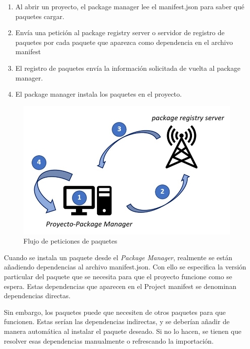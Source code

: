 \begin{enumerate}
    \item Al abrir un proyecto, el package manager lee el manifest.json para saber qué paquetes cargar.
    \item Envía una petición al package registry server o servidor de registro de paquetes por cada paquete que aparezca como dependencia en el archivo manifest
    \item El registro de paquetes envía la información solicitada de vuelta al package manager.
    \item El package manager instala los paquetes en el proyecto.
\end{enumerate}

\begin{figure}[h]
    \centering
    \includegraphics[scale=0.45]{img/PackageManagerFlowchart.jpg}
    \caption{Flujo de peticiones de paquetes}
    \label{fig:FlujoPaquetes}
    \end{figure}

Cuando se instala un paquete desde el \textit{Package Manager}, realmente se están añadiendo dependencias al archivo manifest.json. Con ello se especifica la versión particular del paquete que se necesita para que el proyecto funcione como se espera. Estas dependencias que aparecen en el Project manifest se denominan dependencias directas.

Sin embargo, los paquetes puede que necesiten de otros paquetes para que funcionen. Estas serían las dependencias indirectas, y se deberían añadir de manera automática al instalar el paquete deseado. Si no lo hacen, se tienen que resolver esas dependencias manualmente o refrescando la importación.

